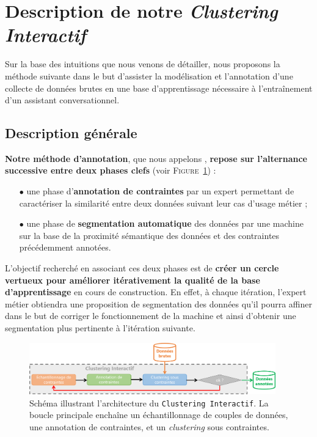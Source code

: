 \section{Description de notre \textit{Clustering Interactif}}
\label{section:3.2-DESCRIPTION-THEORIQUE}

	Sur la base des intuitions que nous venons de détailler, nous proposons la méthode suivante dans le but d'assister la modélisation et l'annotation d'une collecte de données brutes en une base d'apprentissage nécessaire à l'entraînement d'un assistant conversationnel.
	
	\subsection{Description générale}
	\label{section:3.2.1-DESCRIPTION-THEORIQUE-GENERALE}
	
		\textbf{Notre méthode d'annotation}, que nous appelons , \textbf{repose sur l'alternance successive entre deux phases clefs} (voir \textsc{Figure~\ref{figure:3.2.1-DESCRIPTION-THEORIQUE-GENERALE}}) :
		\begin{itemize}
			\item[\(\bullet\)] une phase d'\textbf{annotation de contraintes}
			par un expert permettant de caractériser la similarité entre deux données suivant leur cas d'usage métier ;
			\item[\(\bullet\)] une phase de \textbf{segmentation automatique} des données
			par une machine sur la base de la proximité sémantique des données et des contraintes précédemment annotées.
		\end{itemize}
		
		L'objectif recherché en associant ces deux phases est de \textbf{créer un cercle vertueux pour améliorer itérativement la qualité de la base d'apprentissage} en cours de construction.
		En effet, à chaque itération, l'expert métier obtiendra une proposition de segmentation des données qu'il pourra affiner dans le but de corriger le fonctionnement de la machine et ainsi d'obtenir une segmentation plus pertinente à l'itération suivante.
		
		\begin{figure}[!htb]
			\centering
			\includegraphics[width=0.95\textwidth]{figures/interactive-clustering-architecture-sequentielle}
			\caption{
				Schéma illustrant l'architecture du \texttt{Clustering Interactif}.
				La boucle principale enchaîne un échantillonnage de couples de données, une annotation de contraintes, et un \textit{clustering} sous contraintes.
			}
			\label{figure:3.2.1-DESCRIPTION-THEORIQUE-GENERALE}
		\end{figure}
	
